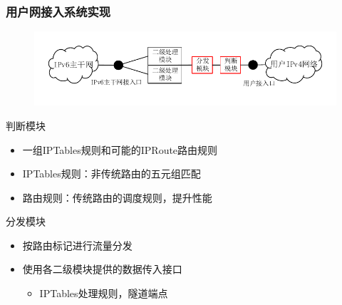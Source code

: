 \documentclass{beamer}
\begin{document}
\begin{frame}
  \frametitle{用户网接入系统实现}
  \vspace{-1em}
  \begin{figure}
    \includegraphics[width=\textwidth]{figs/10-user-access-point-b.pdf}
  \end{figure}
  \vspace{-2em}

  \begin{block}{判断模块}
    \begin{itemize}
    \item 一组IPTables规则和可能的IPRoute路由规则
    \item IPTables规则：非传统路由的五元组匹配
    \item 路由规则：传统路由的调度规则，提升性能
    \end{itemize}
  \end{block}

  \begin{block}{分发模块}
    \begin{itemize}
    \item 按路由标记进行流量分发
    \item 使用各二级模块提供的数据传入接口
      \begin{itemize}
      \item IPTables处理规则，隧道端点
      \end{itemize}
    \end{itemize}
  \end{block}
\end{frame}
\end{document}
